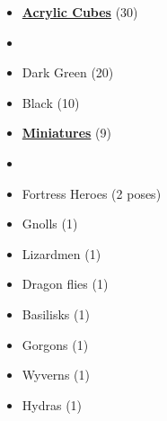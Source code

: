 \begin{multicols*}{3}
\begin{itemize}[leftmargin=0pt, label={}, noitemsep, noitemsep]
  \item \textbf{\small{\underline{Acrylic Cubes}}} (30)
  \item
  \item Dark Green (20)
  \item Black (10)
\end{itemize}

\begin{itemize}[leftmargin=0pt, label={}, noitemsep, noitemsep]
  \item \textbf{\small{\underline{Miniatures}}} (9)
  \item
  \item Fortress Heroes (2 poses)
  \item Gnolls (1)
  \item Lizardmen (1)
  \item Dragon flies (1)
  \item Basilisks (1)
  \item Gorgons (1)
  \item Wyverns (1)
  \item Hydras (1)
\end{itemize}

\columnbreak


\end{multicols*}
